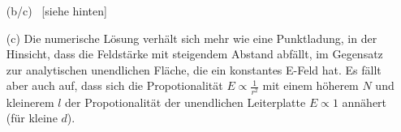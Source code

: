 \documentclass[11pt,letterpaper]{article}
\begin{document}
\begin{enumerate}
\begin{enumerate}
            \item[(b/c)] \ [siehe hinten]\\

            \item [(c)]
            Die numerische Lösung verhält sich mehr wie eine Punktladung, in der Hinsicht, dass 
            die Feldstärke mit steigendem Abstand abfällt, im Gegensatz zur 
            analytischen unendlichen Fläche, die ein konstantes E-Feld hat. 
            Es fällt aber auch auf, dass sich die Propotionalität $E\propto\frac{1}{r^2}$ mit einem 
            höherem $N$ und kleinerem $l$ der Propotionalität der unendlichen Leiterplatte 
            $E\propto 1$ annähert (für kleine $d$).
            
        \end{enumerate}
\end{enumerate}

\end{document}
